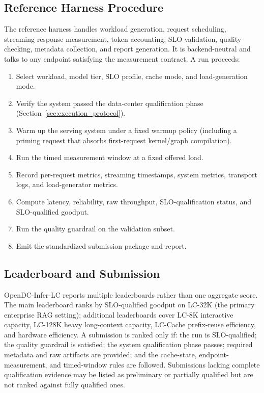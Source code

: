 \subsection{Reference Harness Procedure}
\label{subsec:harness}
The reference harness handles workload generation, request scheduling,
streaming-response measurement, token accounting, SLO validation, quality
checking, metadata collection, and report generation. It is backend-neutral and
talks to any endpoint satisfying the measurement contract. A run proceeds:
\begin{enumerate}
    \item Select workload, model tier, SLO profile, cache mode, and load-generation mode.
    \item Verify the system passed the data-center qualification phase (Section~\ref{sec:execution_protocol}).
    \item Warm up the serving system under a fixed warmup policy (including a priming request that absorbs first-request kernel/graph compilation).
    \item Run the timed measurement window at a fixed offered load.
    \item Record per-request metrics, streaming timestamps, system metrics, transport logs, and load-generator metrics.
    \item Compute latency, reliability, raw throughput, SLO-qualification status, and SLO-qualified goodput.
    \item Run the quality guardrail on the validation subset.
    \item Emit the standardized submission package and report.
\end{enumerate}

\subsection{Leaderboard and Submission}
\label{subsec:leaderboard}
OpenDC-Infer-LC reports multiple leaderboards rather than one aggregate score. The
main leaderboard ranks by SLO-qualified goodput on LC-32K (the primary enterprise
RAG setting); additional leaderboards cover LC-8K interactive capacity, LC-128K
heavy long-context capacity, LC-Cache prefix-reuse efficiency, and hardware
efficiency. A submission is ranked only if: the run is SLO-qualified; the quality
guardrail is satisfied; the system qualification phase passes; required metadata
and raw artifacts are provided; and the cache-state, endpoint-measurement, and
timed-window rules are followed. Submissions lacking complete qualification
evidence may be listed as preliminary or partially qualified but are not ranked
against fully qualified ones.
